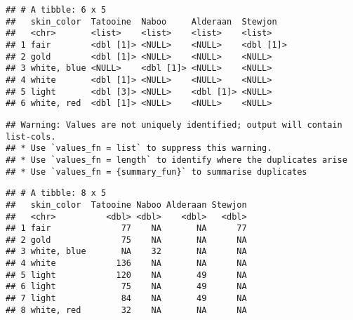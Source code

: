 \documentclass[]{book}
\newenvironment{Shaded}{\begin{snugshade}}{\end{snugshade}}
\newcommand{\DataTypeTok}[1]{\textcolor[rgb]{0.13,0.29,0.53}{#1}}
\newcommand{\DecValTok}[1]{\textcolor[rgb]{0.00,0.00,0.81}{#1}}
\newcommand{\KeywordTok}[1]{\textcolor[rgb]{0.13,0.29,0.53}{\textbf{#1}}}
\newcommand{\NormalTok}[1]{#1}
\newcommand{\OperatorTok}[1]{\textcolor[rgb]{0.81,0.36,0.00}{\textbf{#1}}}
\newcommand{\StringTok}[1]{\textcolor[rgb]{0.31,0.60,0.02}{#1}}
\begin{document}
\begin{verbatim}
## # A tibble: 6 x 5
##   skin_color  Tatooine  Naboo     Alderaan  Stewjon  
##   <chr>       <list>    <list>    <list>    <list>   
## 1 fair        <dbl [1]> <NULL>    <NULL>    <dbl [1]>
## 2 gold        <dbl [1]> <NULL>    <NULL>    <NULL>   
## 3 white, blue <NULL>    <dbl [1]> <NULL>    <NULL>   
## 4 white       <dbl [1]> <NULL>    <NULL>    <NULL>   
## 5 light       <dbl [3]> <NULL>    <dbl [1]> <NULL>   
## 6 white, red  <dbl [1]> <NULL>    <NULL>    <NULL>
\end{verbatim}

\begin{Shaded}
\end{Shaded}

\begin{verbatim}
## Warning: Values are not uniquely identified; output will contain list-cols.
## * Use `values_fn = list` to suppress this warning.
## * Use `values_fn = length` to identify where the duplicates arise
## * Use `values_fn = {summary_fun}` to summarise duplicates
\end{verbatim}

\begin{verbatim}
## # A tibble: 8 x 5
##   skin_color  Tatooine Naboo Alderaan Stewjon
##   <chr>          <dbl> <dbl>    <dbl>   <dbl>
## 1 fair              77    NA       NA      77
## 2 gold              75    NA       NA      NA
## 3 white, blue       NA    32       NA      NA
## 4 white            136    NA       NA      NA
## 5 light            120    NA       49      NA
## 6 light             75    NA       49      NA
## 7 light             84    NA       49      NA
## 8 white, red        32    NA       NA      NA
\end{verbatim}
\end{document}
